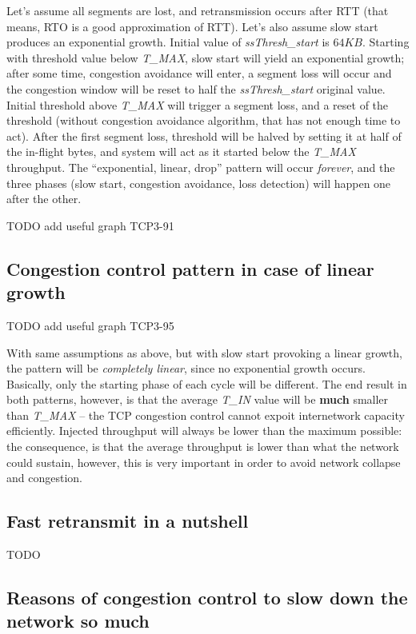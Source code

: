 \documentclass[a4paper, 11pt]{report}
\begin{document}
Let's assume all segments are lost, and retransmission occurs after RTT (that
means, RTO is a good approximation of RTT). Let's also assume slow start
produces an exponential growth. Initial value of \emph{ssThresh\_start} is
$64KB$. Starting with threshold value below \emph{T\_MAX}, slow start will
yield an exponential growth; after some time, congestion avoidance will enter,
a segment loss will occur and the congestion window will be reset to half the
\emph{ssThresh\_start} original value. Initial threshold above \emph{T\_MAX}
will trigger a segment loss, and a reset of the threshold (without congestion
avoidance algorithm, that has not enough time to act). After the first segment
loss, threshold will be halved by setting it at half of the in-flight bytes,
and system will act as it started below the \emph{T\_MAX} throughput. The
``exponential, linear, drop'' pattern will occur \emph{forever}, and the three
phases (slow start, congestion avoidance, loss detection) will happen one after
the other.

TODO add useful graph TCP3-91

\subsection{Congestion control pattern in case of linear growth}

TODO add useful graph TCP3-95

With same assumptions as above, but with slow start provoking a linear growth,
the pattern will be \emph{completely linear}, since no exponential growth
occurs. Basically, only the starting phase of each cycle will be different. The
end result in both patterns, however, is that the average \emph{T\_IN} value
will be \textbf{much} smaller than \emph{T\_MAX} \--- the TCP congestion
control cannot expoit internetwork capacity efficiently. Injected throughput
will always be lower than the maximum possible: the consequence, is that the
average throughput is lower than what the network could sustain, however, this
is very important in order to avoid network collapse and congestion.

\subsection{Fast retransmit in a nutshell}

TODO

\subsection{Reasons of congestion control to slow down the network so much}
\end{document}
